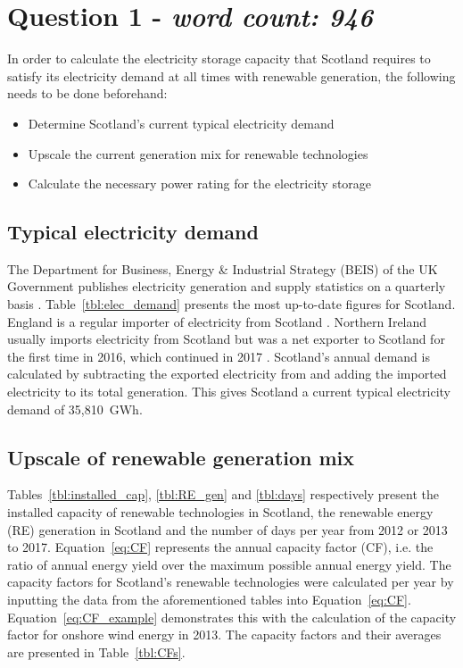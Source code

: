 \section{Question 1 - \textit{word count: 946}}



In order to calculate the electricity storage capacity that Scotland requires to satisfy its electricity demand at all times with renewable generation, the following needs to be done beforehand:
\begin{itemize}
	\item Determine Scotland's current typical electricity demand
	\item Upscale the current generation mix for renewable technologies
	\item Calculate the necessary power rating for the electricity storage
\end{itemize}




\subsection{Typical electricity demand}

The Department for Business, Energy {\&} Industrial Strategy (BEIS) of the UK Government publishes electricity generation and supply statistics on a quarterly basis \citep{BEIS2018ElecUK}.
Table~\ref{tbl:elec_demand} presents the most up-to-date figures for Scotland.
England is a regular importer of electricity from Scotland \citep{BEIS2018EnergyTrends}.
Northern Ireland usually imports electricity from Scotland but was a net exporter to Scotland for the first time in 2016, which continued in 2017 \citep{BEIS2018EnergyTrends}.
Scotland's annual demand is calculated by subtracting the exported electricity from and adding the imported electricity to its total generation.
This gives Scotland a current typical electricity demand of 35,810~GWh.






\subsection{Upscale of renewable generation mix}

Tables~\ref{tbl:installed_cap}, \ref{tbl:RE_gen} and \ref{tbl:days} respectively present the installed capacity of renewable technologies in Scotland, the renewable energy (RE) generation in Scotland and the number of days per year from 2012 or 2013 to 2017.
Equation~\ref{eq:CF} represents the annual capacity factor (CF), i.e. the ratio of annual energy yield over the maximum possible annual energy yield.
The capacity factors for Scotland's renewable technologies were calculated per year by inputting the data from the aforementioned tables into Equation~\ref{eq:CF}.
Equation~\ref{eq:CF_example} demonstrates this with the calculation of the capacity factor for onshore wind energy in 2013.
The capacity factors and their averages are presented in Table~\ref{tbl:CFs}.

